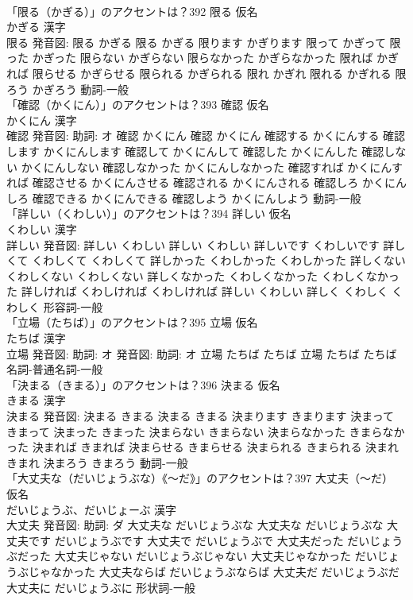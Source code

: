 \documentclass[8pt]{extreport}
\begin{document}
\begin{CJK}{UTF8}{min}
\\	「限る（かぎる）」のアクセントは？392	限る 仮名　
\\	かぎる 漢字　
\\	限る 発音図:	限る かぎる		限る かぎる 限ります かぎります 限って かぎって 限った かぎった 限らない かぎらない 限らなかった かぎらなかった 限れば かぎれば 限らせる かぎらせる 限られる かぎられる 限れ かぎれ 限れる かぎれる 限ろう かぎろう				動詞-一般 
\\	「確認（かくにん）」のアクセントは？393	確認 仮名　
\\	かくにん 漢字　
\\	確認 発音図: 助詞: オ	確認 かくにん		確認 かくにん 確認する かくにんする 確認します かくにんします 確認して かくにんして 確認した かくにんした 確認しない かくにんしない 確認しなかった かくにんしなかった 確認すれば かくにんすれば 確認させる かくにんさせる 確認される かくにんされる 確認しろ かくにんしろ 確認できる かくにんできる 確認しよう かくにんしよう				動詞-一般 
\\	「詳しい（くわしい）」のアクセントは？394	詳しい 仮名　
\\	くわしい 漢字　
\\	詳しい 発音図:	詳しい くわしい		詳しい くわしい 詳しいです くわしいです 詳しくて くわしくて くわしくて 詳しかった くわしかった くわしかった 詳しくない くわしくない くわしくない 詳しくなかった くわしくなかった くわしくなかった 詳しければ くわしければ くわしければ 詳しい くわしい 詳しく くわしく くわしく				形容詞-一般 
\\	「立場（たちば）」のアクセントは？395	立場 仮名　
\\	たちば 漢字　
\\	立場 発音図: 助詞: オ 発音図: 助詞: オ	立場 たちば たちば		立場 たちば たちば				名詞-普通名詞-一般 
\\	「決まる（きまる）」のアクセントは？396	決まる 仮名　
\\	きまる 漢字　
\\	決まる 発音図:	決まる きまる		決まる きまる 決まります きまります 決まって きまって 決まった きまった 決まらない きまらない 決まらなかった きまらなかった 決まれば きまれば 決まらせる きまらせる 決まられる きまられる 決まれ きまれ 決まろう きまろう				動詞-一般 
\\	「大丈夫な（だいじょうぶな）《〜だ》」のアクセントは？397	大丈夫（〜だ） 仮名　
\\	だいじょうぶ、だいじょーぶ 漢字　
\\	大丈夫 発音図: 助詞: ダ	大丈夫な だいじょうぶな		大丈夫な だいじょうぶな 大丈夫です だいじょうぶです 大丈夫で だいじょうぶで 大丈夫だった だいじょうぶだった 大丈夫じゃない だいじょうぶじゃない 大丈夫じゃなかった だいじょうぶじゃなかった 大丈夫ならば だいじょうぶならば 大丈夫だ だいじょうぶだ 大丈夫に だいじょうぶに				形状詞-一般 

\end{CJK}
\end{document}
